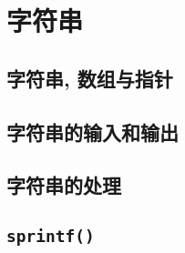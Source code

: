 \chapter{字符串} \label{字符串}
    \section{字符串, 数组与指针}
    \section{字符串的输入和输出}\label{字符串的输入和输出}
    \section{字符串的处理}
    \section{\texttt{sprintf()}}